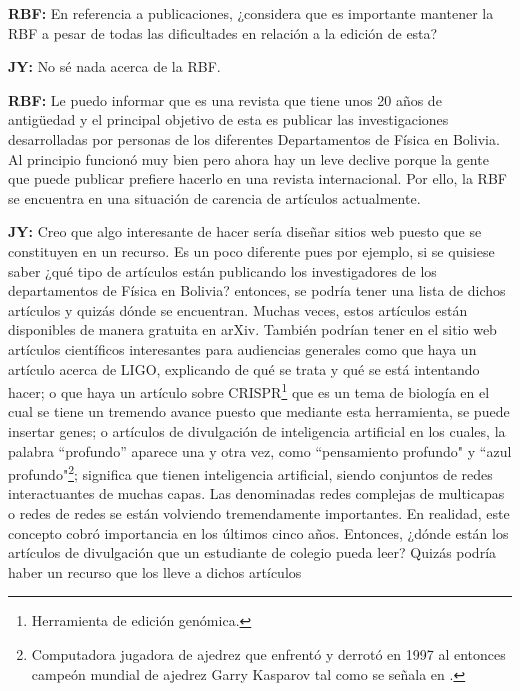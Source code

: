 \documentclass{rbf}
\newcommand{\mr}{{\bf RBF: }}
\newcommand{\jim}{{\bf JY: }}
\begin{document}
\mr En referencia a publicaciones, ¿considera que es importante mantener la RBF a pesar de todas las dificultades en relación a la edición  de esta?

\jim No sé nada acerca de la RBF.

\mr Le puedo informar que es una revista que tiene unos 20 años de antigüedad y el principal objetivo de esta es publicar las investigaciones desarrolladas por personas de los diferentes Departamentos de Física en Bolivia. Al principio funcionó muy bien pero ahora hay un leve declive porque la gente que puede publicar prefiere hacerlo en una revista internacional. Por ello, la RBF se encuentra en una situación de carencia de artículos actualmente.

\jim Creo que algo interesante de hacer sería diseñar sitios web puesto que se constituyen en un recurso. Es un poco diferente pues por ejemplo, si se quisiese saber ¿qué tipo de artículos están publicando los investigadores de los departamentos de Física en Bolivia? entonces, se podría tener una lista de dichos artículos y quizás dónde se encuentran. Muchas veces, estos artículos están disponibles de manera gratuita en arXiv. También podrían tener en el sitio web artículos científicos interesantes para audiencias generales como que haya un artículo acerca de LIGO, explicando de qué se trata y qué se está intentando hacer; o que haya un artículo sobre CRISPR\footnote{Herramienta de edición genómica.} que es un tema de biología en el cual se tiene un tremendo avance puesto que mediante esta herramienta, se puede insertar genes; o artículos de divulgación de inteligencia artificial en los cuales, la palabra ``profundo'' aparece una y otra vez, como ``pensamiento profundo" y ``azul profundo"\footnote{Computadora jugadora de ajedrez que enfrentó y derrotó en 1997 al entonces campeón mundial de ajedrez Garry Kasparov tal como se señala en \cite{WIKI97}.}; significa que tienen inteligencia artificial, siendo conjuntos de redes interactuantes de muchas capas. Las denominadas redes complejas de multicapas o redes de redes se están volviendo tremendamente importantes. En realidad, este concepto cobró importancia en los últimos cinco años. Entonces, ¿dónde están los artículos de divulgación que un estudiante de colegio pueda leer? Quizás podría haber un recurso que los lleve a dichos artículos
\end{document}
